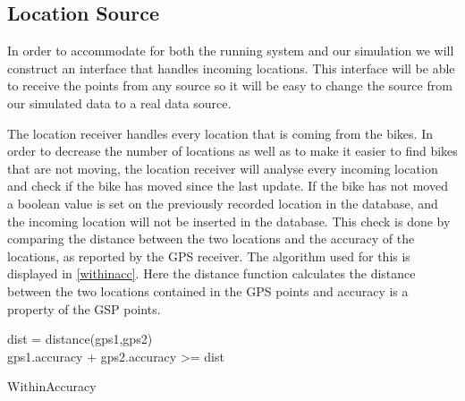 \subsection{Location Source}\label{design:datareceiver}
In order to accommodate for both the running system and our simulation we will construct an interface that handles incoming locations.
This interface will be able to receive the points from any source so it will be easy to change the source from our simulated data to a real data source.

The location receiver handles every location that is coming from the bikes.
In order to decrease the number of locations as well as to make it easier to find bikes that are not moving, the location receiver will analyse every incoming location and check if the bike has moved since the last update.
If the bike has not moved a boolean value is set on the previously recorded location in the database, and the incoming location will not be inserted in the database.
This check is done by comparing the distance between the two locations and the accuracy of the locations, as reported by the GPS receiver.
The algorithm used for this is displayed in \cref{withinacc}.
Here the distance function calculates the distance between the two locations contained in the GPS points and accuracy is a property of the GSP points.

\begin{algorithm}

dist = distance(gps1,gps2)\\
\Return gps1.accuracy + gps2.accuracy >= dist

\caption{WithinAccuracy}
\label{withinacc}
\end{algorithm}
